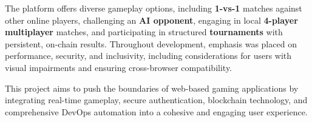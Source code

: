 The platform offers diverse gameplay options, including \textbf{1-vs-1} matches against other online players, challenging an \textbf{AI opponent}, engaging in local \textbf{4-player multiplayer} matches, and participating in structured \textbf{tournaments} with persistent, on-chain results. Throughout development, emphasis was placed on performance, security, and inclusivity, including considerations for users with visual impairments and ensuring cross-browser compatibility.

This project aims to push the boundaries of web-based gaming applications by integrating real-time gameplay, secure authentication, blockchain technology, and comprehensive DevOps automation into a cohesive and engaging user experience.
